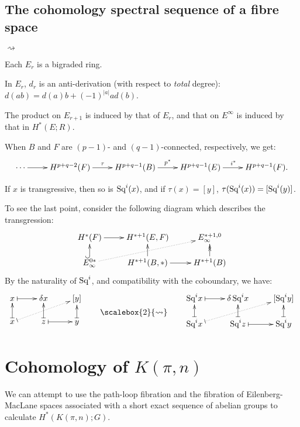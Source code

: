 \documentclass[11pt]{article}
\newcommand{\Squ}{\textup{Sq}}
\theoremstyle{plain}
\theoremstyle{definition}
\newcommand{\bigrightsquig}{\scalebox{2}{\ensuremath{\rightsquigarrow}}}
\newcommand{\squishlist}{
  \setlength{\itemsep}{1pt}
  \setlength{\parskip}{0pt}
  \setlength{\parsep}{0pt}
}
\newenvironment{itemise}{
\begin{list}{\textup{$\rightsquigarrow$}}
   {
      \setlength{\topsep}{.1cm}
      \setlength{\itemsep}{1pt}
      \setlength{\parskip}{0pt}
      \setlength{\parsep}{0pt}
   }
}{\end{list}\vspace{-.2cm}}
\begin{document}
\subsection{The cohomology spectral sequence of a fibre space}
\begin{itemise}
\squishlist
\item Each $E_r$ is a bigraded ring.
\item In $E_r$, $d_r$ is an anti-derivation (with respect to \emph{total} degree): $d(ab)=d(a)b+(-1)^{|a|}ad(b)$.
\item The product on $E_{r+1}$ is induced by that of $E_r$, and that on $E^\infty$ is induced by that in $H^*(E;R)$.
\item When $B$ and $F$ are $(p-1)$- and $(q-1)$-connected, respectively, we get:
\[\xymatrix{
\cdots\ar[r]&H^{p+q-2}(F)\ar[r]^\tau&H^{p+q-1}(B)\ar[r]^{p^*}&H^{p+q-1}(E)\ar[r]^{i^*}&H^{p+q-1}(F).
}\]
\item If $x$ is transgressive, then so is $\Squ^i(x)$, and if $\tau(x)=[y]$, $\tau(\Squ^i(x))=[\Squ^i(y)]$.
\end{itemise}
To see the last point, consider the following diagram which describes the transgression:
\[\xymatrix@R=5mm{
H^*(F)\ar[r]&H^{*+1}(E,F)&E_\infty^{*+1,0}\\
E_\infty^{0*}\ar@{^{(}->}[u]\ar@{.>}[rur]&H^{*+1}(B,*)\ar[u]\ar[r]&H^{*+1}(B)\ar@{->>}[u]
}\]
By the naturality of $\Squ^i$, and compatibility with the coboundary, we have:
\[\xymatrix@R=5mm{
x\ar@{|->}[r]&\delta x&[y]\\
x\ar@{|.>}[rur]\ar@{|->}[u]&z\ar@{|->}[u]\ar@{|->}[r]&y\ar@{|->}[u]
}\raisebox{-.6cm}{\qquad\bigrightsquig\qquad }
\xymatrix@R=5mm{
\Squ^ix\ar@{|->}[r]&\delta\,\Squ^ix&[\Squ^iy]\\
\Squ^ix\ar@{|.>}[rur]\ar@{|->}[u]&\Squ^iz\ar@{|->}[u]\ar@{|->}[r]&\Squ^iy\ar@{|->}[u]
}\]

\section{Cohomology of \texorpdfstring{$K(\pi,n)$}{K(G,n)}}
We can attempt to use the path-loop fibration and the fibration of Eilenberg-MacLane spaces associated with a short exact sequence of abelian groups to calculate $H^*(K(\pi,n);G)$.
\end{document}
